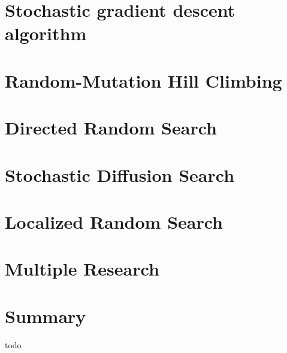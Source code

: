 \section{Stochastic gradient descent algorithm}
\section{Random-Mutation Hill Climbing}
\section{Directed Random Search}
\section{Stochastic Diffusion Search}


\section{Localized Random Search}
\section{Multiple Research}


\section{Summary}
todo
